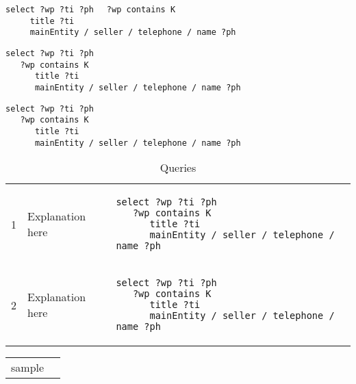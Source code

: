 \verb|select ?wp ?ti ?ph|
\verb|  ?wp contains K|\\
\verb|     title ?ti|\\
\verb|     mainEntity / seller / telephone / name ?ph|

\begin{lstlisting}
select ?wp ?ti ?ph
   ?wp contains K
      title ?ti
      mainEntity / seller / telephone / name ?ph
\end{lstlisting}

\begin{verbatim}
select ?wp ?ti ?ph
   ?wp contains K
      title ?ti
      mainEntity / seller / telephone / name ?ph
\end{verbatim}

\begin{table} 
    \begin{tabular}{ l l l }
        1 & Explanation here & 
\begin{minipage}{2in}\begin{verbatim}
select ?wp ?ti ?ph
   ?wp contains K
      title ?ti
      mainEntity / seller / telephone / name ?ph
\end{verbatim}\end{minipage}\\ 
        2 & Explanation here & 
\begin{minipage}{3in}\begin{lstlisting}
select ?wp ?ti ?ph
   ?wp contains K
      title ?ti
      mainEntity / seller / telephone / name ?ph
\end{lstlisting}\end{minipage}\\  
    \end{tabular} 
    \caption{Queries} 
\end{table}

\begin{tabular}{ ll }
sample &

\end{tabular}